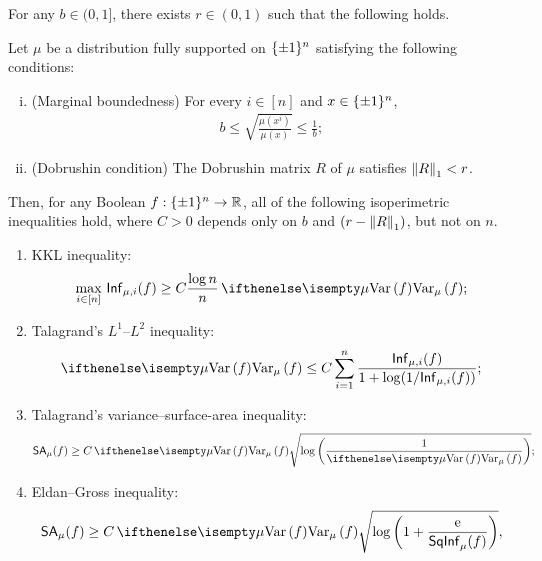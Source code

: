 \begin{theorem}
    \label{thm:informal}
    For any $b \in (0,1]$, there exists $r \in (0,1)$ such that the following holds.
    
    Let $\mu$ be a distribution fully supported on $\{\pm 1\}^n$ satisfying the following conditions: 
    \begin{enumerate}[(i)]
        \item (Marginal boundedness) For every $i \in [n]$ and $x \in \{\pm 1\}^n$,
        \begin{align*}
            b \le \sqrt{\frac{\mu(x^i)}{\mu(x)}} \le \frac{1}{b};
        \end{align*}

        \item (Dobrushin condition) The Dobrushin matrix $R$ of $\mu$ satisfies $\left\lVert R \right\rVert_1 < r$.
    \end{enumerate}
    Then, for any Boolean $f: \{\pm 1\}^n \to \mathbb{R}$, all of the following isoperimetric inequalities hold, where $C>0$ depends only on $b$ and $(r-\left\lVert R \right\rVert_1)$, but not on $n$.
    \begin{enumerate}[(1)]
        \item KKL inequality:
        \begin{equation}\label{eq:inf-KKL}
            \max_{i\in[n]} \,\Inf_{\mu,i}(f)
            \geq C \frac{\log n}{n} \,\Var[\mu]{f};
        \end{equation}

        \item Talagrand's $L^1$--$L^2$ inequality:
        \begin{equation}\label{eq:inf-L1-L2}
            \Var[\mu]{f}
            \leq C \sum_{i=1}^n
            \frac{\Inf_{\mu,i}(f)}{1+\log(1/\Inf_{\mu,i}(f))};
        \end{equation}

        \item Talagrand's variance--surface-area inequality:
        \begin{equation}\label{eq:inf-var-SA}
            \SurfArea_\mu(f)
            \geq C\,\Var[\mu]{f}
            \sqrt{\log\left(\frac{1}{\Var[\mu]{f}}\right)};
        \end{equation}

        \item Eldan--Gross inequality:
        \begin{equation}\label{eq:inf-EG}
            \SurfArea_\mu(f)
            \geq C\,\Var[\mu]{f}
            \sqrt{\log\left(1+\frac{\e}{\SqInf_\mu(f)}\right)},
        \end{equation}
    \end{enumerate}
\end{theorem}


